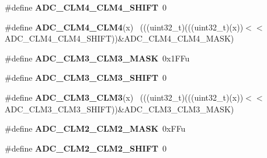 \begin{DoxyCompactItemize}
\item 
\hypertarget{group___a_d_c___register___masks_gafa9121fc54ce9386fdc4c1d05f45d0de}{}\#define {\bfseries A\+D\+C\+\_\+\+C\+L\+M4\+\_\+\+C\+L\+M4\+\_\+\+S\+H\+I\+F\+T}~0\label{group___a_d_c___register___masks_gafa9121fc54ce9386fdc4c1d05f45d0de}

\item 
\hypertarget{group___a_d_c___register___masks_ga8fe6607d44a572792ff6df0b119716ae}{}\#define {\bfseries A\+D\+C\+\_\+\+C\+L\+M4\+\_\+\+C\+L\+M4}(x)                                              ~(((uint32\+\_\+t)(((uint32\+\_\+t)(x))$<$$<$A\+D\+C\+\_\+\+C\+L\+M4\+\_\+\+C\+L\+M4\+\_\+\+S\+H\+I\+F\+T))\&A\+D\+C\+\_\+\+C\+L\+M4\+\_\+\+C\+L\+M4\+\_\+\+M\+A\+S\+K)\label{group___a_d_c___register___masks_ga8fe6607d44a572792ff6df0b119716ae}

\item 
\hypertarget{group___a_d_c___register___masks_ga546b5a27d980deed324add231c050a6f}{}\#define {\bfseries A\+D\+C\+\_\+\+C\+L\+M3\+\_\+\+C\+L\+M3\+\_\+\+M\+A\+S\+K}~0x1\+F\+Fu\label{group___a_d_c___register___masks_ga546b5a27d980deed324add231c050a6f}

\item 
\hypertarget{group___a_d_c___register___masks_ga9bdd0a97bea9576ea5c9eccd54c08940}{}\#define {\bfseries A\+D\+C\+\_\+\+C\+L\+M3\+\_\+\+C\+L\+M3\+\_\+\+S\+H\+I\+F\+T}~0\label{group___a_d_c___register___masks_ga9bdd0a97bea9576ea5c9eccd54c08940}

\item 
\hypertarget{group___a_d_c___register___masks_ga804fa8f0631204819dad8ccb2e32acea}{}\#define {\bfseries A\+D\+C\+\_\+\+C\+L\+M3\+\_\+\+C\+L\+M3}(x)                                              ~(((uint32\+\_\+t)(((uint32\+\_\+t)(x))$<$$<$A\+D\+C\+\_\+\+C\+L\+M3\+\_\+\+C\+L\+M3\+\_\+\+S\+H\+I\+F\+T))\&A\+D\+C\+\_\+\+C\+L\+M3\+\_\+\+C\+L\+M3\+\_\+\+M\+A\+S\+K)\label{group___a_d_c___register___masks_ga804fa8f0631204819dad8ccb2e32acea}

\item 
\hypertarget{group___a_d_c___register___masks_ga815d6f1bf2d38384c8fd0dd4f07f7a08}{}\#define {\bfseries A\+D\+C\+\_\+\+C\+L\+M2\+\_\+\+C\+L\+M2\+\_\+\+M\+A\+S\+K}~0x\+F\+Fu\label{group___a_d_c___register___masks_ga815d6f1bf2d38384c8fd0dd4f07f7a08}

\item 
\hypertarget{group___a_d_c___register___masks_ga945ed262c088eecda09d679df33ab193}{}\#define {\bfseries A\+D\+C\+\_\+\+C\+L\+M2\+\_\+\+C\+L\+M2\+\_\+\+S\+H\+I\+F\+T}~0\label{group___a_d_c___register___masks_ga945ed262c088eecda09d679df33ab193}


\end{DoxyCompactItemize}
